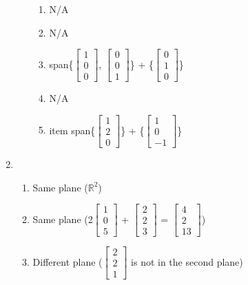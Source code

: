 \documentclass{article}
\begin{document}
\begin{solution}
\begin{enumerate}
\begin{enumerate}
\begin{enumerate}
                        \item N/A
                        \item N/A
                        \item span\{$\begin{bmatrix}1\\0\\0\end{bmatrix}$, $\begin{bmatrix}0\\0\\1\end{bmatrix}$\} + \{$\begin{bmatrix}0\\1\\0\end{bmatrix}$\}
                        \item N/A
                        \item item span\{$\begin{bmatrix}1\\2\\0\end{bmatrix}$\} + \{$\begin{bmatrix}1\\0\\-1\end{bmatrix}$\}
                    \end{enumerate}
            \end{enumerate}
        \item
            \begin{enumerate}
                \item Same plane ($\mathbb{R}^{2}$)
                \item Same plane (2$\begin{bmatrix}1\\0\\5\end{bmatrix}$ + $\begin{bmatrix}2\\2\\3\end{bmatrix}$ = $\begin{bmatrix}4\\2\\13\end{bmatrix}$)
                \item Different plane ($\begin{bmatrix}2\\2\\1\end{bmatrix}$ is not in the second plane)

\end{enumerate}
\end{enumerate}
\end{solution}
\end{document}
